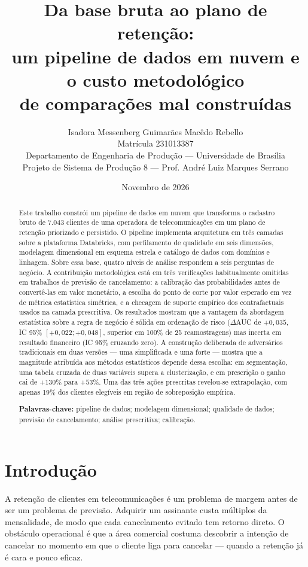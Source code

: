 \documentclass[10pt,a4paper]{article}
\title{\vspace{-1.2cm}\textbf{Da base bruta ao plano de retenção:\\
um pipeline de dados em nuvem e o custo metodológico\\
de comparações mal construídas}}
\author{
  Isadora Messenberg Guimarães Macêdo Rebello \\
  \small Matrícula 231013387 \\
  \small Departamento de Engenharia de Produção --- Universidade de Brasília \\
  \small Projeto de Sistema de Produção 8 --- Prof. André Luiz Marques Serrano
}
\date{\small Novembro de 2026}
\begin{document}
\maketitle

\begin{abstract}
\noindent
\small
Este trabalho constrói um pipeline de dados em nuvem que transforma o cadastro bruto de
7.043 clientes de uma operadora de telecomunicações em um plano de retenção priorizado e
persistido. O pipeline implementa arquitetura em três camadas sobre a plataforma
Databricks, com perfilamento de qualidade em seis dimensões, modelagem dimensional em
esquema estrela e catálogo de dados com domínios e linhagem. Sobre essa base, quatro
níveis de análise respondem a seis perguntas de negócio. A contribuição metodológica
está em três verificações habitualmente omitidas em trabalhos de previsão de
cancelamento: a calibração das probabilidades antes de convertê-las em valor monetário, a
escolha do ponto de corte por valor esperado em vez de métrica estatística simétrica, e a
checagem de suporte empírico dos contrafactuais usados na camada prescritiva. Os
resultados mostram que a vantagem da abordagem estatística sobre a regra de negócio é
sólida em ordenação de risco (\(\Delta\)AUC de \(+0{,}035\), IC 95\% \([+0{,}022;
+0{,}048]\), superior em 100\% de 25 reamostragens) mas incerta em resultado financeiro
(IC 95\% cruzando zero). A construção deliberada de adversários tradicionais em duas
versões --- uma simplificada e uma forte --- mostra que a magnitude atribuída aos métodos
estatísticos depende dessa escolha: em segmentação, uma tabela cruzada de duas variáveis
supera a clusterização, e em prescrição o ganho cai de \(+130\%\) para \(+53\%\). Uma das
três ações prescritas revelou-se extrapolação, com apenas 19\% dos clientes elegíveis em
região de sobreposição empírica.

\vspace{4pt}
\noindent\textbf{Palavras-chave:} pipeline de dados; modelagem dimensional; qualidade de
dados; previsão de cancelamento; análise prescritiva; calibração.
\end{abstract}

\section{Introdução}

A retenção de clientes em telecomunicações é um problema de margem antes de ser um
problema de previsão. Adquirir um assinante custa múltiplos da mensalidade, de modo que
cada cancelamento evitado tem retorno direto. O obstáculo operacional é que a área
comercial costuma descobrir a intenção de cancelar no momento em que o cliente liga para
cancelar --- quando a retenção já é cara e pouco eficaz.
\end{document}
